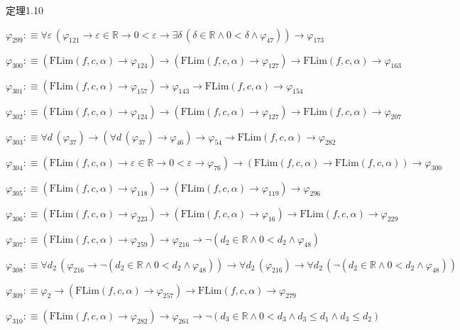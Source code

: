 \begin{fullproof}{定理1.10}
\begin{abbrevlist}
\item $\varphi_{299} :\equiv \forall \varepsilon\,(\varphi_{121} \to \varepsilon \in \mathbb{R} \to 0 < \varepsilon \to \exists \delta\,(\delta \in \mathbb{R} \land 0 < \delta \land \varphi_{47})) \to \varphi_{173}$
\item $\varphi_{300} :\equiv (\mathrm{FLim}(f,c,\alpha) \to \varphi_{124}) \to (\mathrm{FLim}(f,c,\alpha) \to \varphi_{127}) \to \mathrm{FLim}(f,c,\alpha) \to \varphi_{163}$
\item $\varphi_{301} :\equiv (\mathrm{FLim}(f,c,\alpha) \to \varphi_{157}) \to \varphi_{143} \to \mathrm{FLim}(f,c,\alpha) \to \varphi_{154}$
\item $\varphi_{302} :\equiv (\mathrm{FLim}(f,c,\alpha) \to \varphi_{124}) \to (\mathrm{FLim}(f,c,\alpha) \to \varphi_{127}) \to \mathrm{FLim}(f,c,\alpha) \to \varphi_{207}$
\item $\varphi_{303} :\equiv \forall d\,(\varphi_{37}) \to (\forall d\,(\varphi_{37}) \to \varphi_{46}) \to \varphi_{54} \to \mathrm{FLim}(f,c,\alpha) \to \varphi_{282}$
\item $\varphi_{304} :\equiv (\mathrm{FLim}(f,c,\alpha) \to \varepsilon \in \mathbb{R} \to 0 < \varepsilon \to \varphi_{76}) \to (\mathrm{FLim}(f,c,\alpha) \to \mathrm{FLim}(f,c,\alpha)) \to \varphi_{300}$
\item $\varphi_{305} :\equiv (\mathrm{FLim}(f,c,\alpha) \to \varphi_{118}) \to (\mathrm{FLim}(f,c,\alpha) \to \varphi_{119}) \to \varphi_{296}$
\item $\varphi_{306} :\equiv (\mathrm{FLim}(f,c,\alpha) \to \varphi_{223}) \to (\mathrm{FLim}(f,c,\alpha) \to \varphi_{16}) \to \mathrm{FLim}(f,c,\alpha) \to \varphi_{229}$
\item $\varphi_{307} :\equiv (\mathrm{FLim}(f,c,\alpha) \to \varphi_{259}) \to \varphi_{216} \to \neg (d_{2} \in \mathbb{R} \land 0 < d_{2} \land \varphi_{48})$
\item $\varphi_{308} :\equiv \forall d_{2}\,(\varphi_{216} \to \neg (d_{2} \in \mathbb{R} \land 0 < d_{2} \land \varphi_{48})) \to \forall d_{2}\,(\varphi_{216}) \to \forall d_{2}\,(\neg (d_{2} \in \mathbb{R} \land 0 < d_{2} \land \varphi_{48}))$
\item $\varphi_{309} :\equiv \varphi_{2} \to (\mathrm{FLim}(f,c,\alpha) \to \varphi_{257}) \to \mathrm{FLim}(f,c,\alpha) \to \varphi_{279}$
\item $\varphi_{310} :\equiv (\mathrm{FLim}(f,c,\alpha) \to \varphi_{282}) \to \varphi_{261} \to \neg (d_{3} \in \mathbb{R} \land 0 < d_{3} \land d_{3} \leq d_{1} \land d_{3} \leq d_{2})$

\end{abbrevlist}
\end{fullproof}
